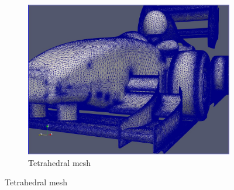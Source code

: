 \begin{figure}[h!]
	\centering
    \begin{subfigure}[b]{0.46\linewidth}
    \includegraphics[width=\textwidth]{tetra.JPG}
    \caption{Tetrahedral mesh}
    \end{subfigure}
    

\end{figure}
